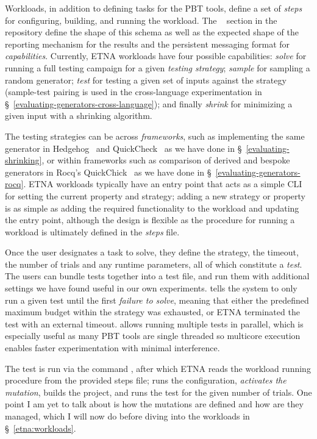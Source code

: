 Workloads, in addition to defining tasks for the PBT tools, define a set of
\emph{steps} for configuring, building, and running the workload. The
~\cite{etna-schemas} section in the  repository define the
shape of this schema as well as the expected shape of the reporting mechanism for the
results and the persistent messaging format for \emph{capabilities}. Currently, ETNA
workloads have four possible capabilities: \emph{solve} for running a full testing
campaign for a given \emph{testing strategy}; \emph{sample} for sampling a random
generator; \emph{test} for testing a given set of inputs against the strategy
(sample-test pairing is used in the cross-language experimentation in
\S~\ref{evaluating-generators-cross-language}); and finally \emph{shrink} for
minimizing a given input with a shrinking algorithm.

The testing strategies can be across \emph{frameworks}, such as implementing the same
generator in Hedgehog~\cite{Hedgehog} and QuickCheck~\cite{quickcheck} as we have done
in \S~\ref{evaluating-shrinking}, or within frameworks such as comparison of derived
and bespoke generators in Rocq's QuickChick~\cite{Pierce:SF4} as we have done in
\S~\ref{evaluating-generators-rocq}. ETNA workloads typically have an entry point that
acts as a simple CLI for setting the current property and strategy; adding a new
strategy or property is as simple as adding the required functionality to the workload
and updating the entry point, although the design is flexible as the procedure for
running a workload is ultimately defined in the \emph{steps} file.

Once the user designates a task to solve, they define the strategy, the timeout, the
number of trials and any runtime parameters, all of which constitute a \emph{test}. The
users can bundle tests together into a test file, and run them with additional settings
we have found useful in our own experiments.  tells the system to
only run a given test until the first \emph{failure to solve}, meaning that either the
predefined maximum budget within the strategy was exhausted, or ETNA terminated the
test with an external timeout.  allows running multiple tests in
parallel, which is especially useful as many PBT tools are single threaded so multicore
execution enables faster experimentation with minimal interference.

The test is run via the command , after
which ETNA reads the workload running procedure from the provided steps file; runs the
configuration, \emph{activates the mutation}, builds the project, and runs the test for
the given number of trials. One point I am yet to talk about is how the mutations are
defined and how are they managed, which I will now do before diving into the workloads
in \S~\ref{etna:workloads}.

